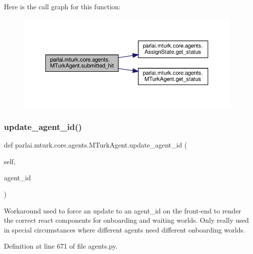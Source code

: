 Here is the call graph for this function\+:
\nopagebreak
\begin{figure}[H]
\begin{center}
\leavevmode
\includegraphics[width=350pt]{classparlai_1_1mturk_1_1core_1_1agents_1_1MTurkAgent_a1bb274c3d2fbfbe79f095ef27b42d820_cgraph}
\end{center}
\end{figure}
\mbox{\label{classparlai_1_1mturk_1_1core_1_1agents_1_1MTurkAgent_a5d4b1243830669cf21676d878045d5a9}} 
\subsubsection{\texorpdfstring{update\+\_\+agent\+\_\+id()}{update\_agent\_id()}}
{\footnotesize\ttfamily def parlai.\+mturk.\+core.\+agents.\+M\+Turk\+Agent.\+update\+\_\+agent\+\_\+id (\begin{DoxyParamCaption}\item[{}]{self,  }\item[{}]{agent\+\_\+id }\end{DoxyParamCaption})}

\begin{DoxyVerb}Workaround used to force an update to an agent_id on the front-end
to render the correct react components for onboarding and waiting
worlds. Only really used in special circumstances where different
agents need different onboarding worlds.
\end{DoxyVerb}
 

Definition at line 671 of file agents.\+py.



